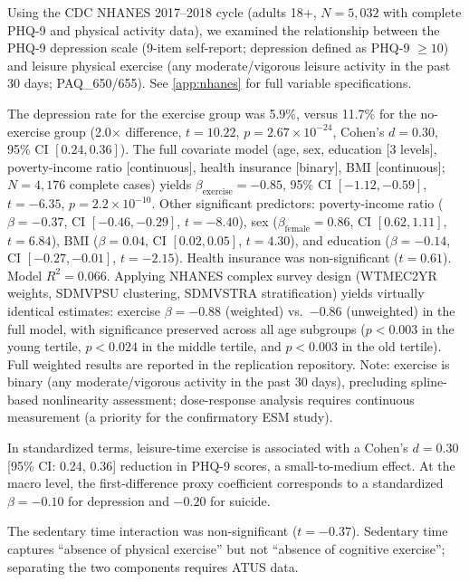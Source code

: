 \documentclass[a4paper,11pt,titlepage]{article}
\begin{document}
Using the CDC NHANES 2017--2018 cycle (adults 18+, $N = 5{,}032$ with complete PHQ-9 and physical activity data), we examined the relationship between the PHQ-9 depression scale (9-item self-report; depression defined as PHQ-9 $\geq 10$) and leisure physical exercise (any moderate/vigorous leisure activity in the past 30 days; PAQ\_650/655). See \cref{app:nhanes} for full variable specifications.

The depression rate for the exercise group was 5.9\%, versus 11.7\% for the no-exercise group (2.0$\times$ difference, $t = 10.22$, $p = 2.67 \times 10^{-24}$, Cohen's $d = 0.30$, 95\% CI $[0.24, 0.36]$). The full covariate model (age, sex, education [3 levels], poverty-income ratio [continuous], health insurance [binary], BMI [continuous]; $N = 4{,}176$ complete cases) yields $\beta_{\text{exercise}} = -0.85$, 95\% CI $[-1.12, -0.59]$, $t = -6.35$, $p = 2.2 \times 10^{-10}$. Other significant predictors: poverty-income ratio ($\beta = -0.37$, CI $[-0.46, -0.29]$, $t = -8.40$), sex ($\beta_{\text{female}} = 0.86$, CI $[0.62, 1.11]$, $t = 6.84$), BMI ($\beta = 0.04$, CI $[0.02, 0.05]$, $t = 4.30$), and education ($\beta = -0.14$, CI $[-0.27, -0.01]$, $t = -2.15$). Health insurance was non-significant ($t = 0.61$). Model $R^2 = 0.066$. Applying NHANES complex survey design (WTMEC2YR weights, SDMVPSU clustering, SDMVSTRA stratification) yields virtually identical estimates: exercise $\beta = -0.88$ (weighted) vs.\ $-0.86$ (unweighted) in the full model, with significance preserved across all age subgroups ($p < 0.003$ in the young tertile, $p < 0.024$ in the middle tertile, and $p < 0.003$ in the old tertile). Full weighted results are reported in the replication repository. Note: exercise is binary (any moderate/vigorous activity in the past 30 days), precluding spline-based nonlinearity assessment; dose-response analysis requires continuous measurement (a priority for the confirmatory ESM study).

In standardized terms, leisure-time exercise is associated with a Cohen's $d = 0.30$ [95\% CI: 0.24, 0.36] reduction in PHQ-9 scores, a small-to-medium effect. At the macro level, the first-difference proxy coefficient corresponds to a standardized $\beta = -0.10$ for depression and $-0.20$ for suicide.

The sedentary time interaction was non-significant ($t = -0.37$). Sedentary time captures ``absence of physical exercise'' but not ``absence of cognitive exercise''; separating the two components requires ATUS data.
\end{document}

